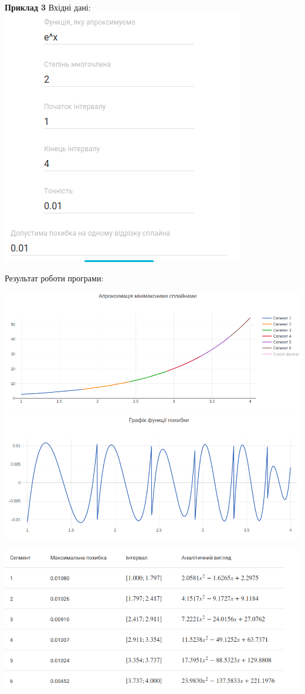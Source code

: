 \documentclass[ukrainian,14pt]{extarticle}
\begin{document}
\textbf{Приклад 3}
Вхідні дані:
\vspace{0.5cm}
\\
\includegraphics[scale=0.7]{example3_inputs}

\vspace{1cm}

Результат роботи програми:
\vspace{0.5cm}

\includegraphics[scale=0.5]{example3}
\includegraphics[scale=0.5]{example_3_error} \\
\vspace{0.5cm}

\includegraphics[scale=0.7]{example3_table}
\end{document}
